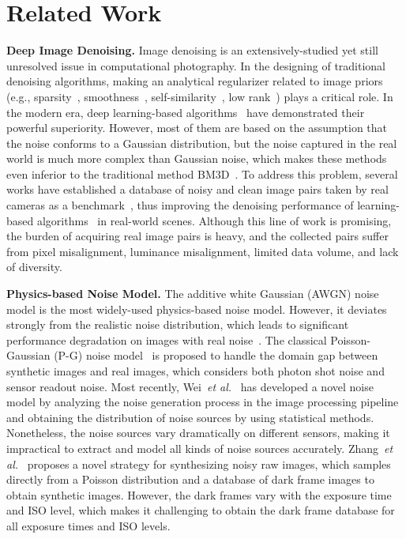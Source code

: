 \documentclass[10pt,twocolumn,letterpaper]{article}
\def\etal{{\it{et al.}}}
\begin{document}
\section{Related Work}
\label{related}
\textbf{Deep Image Denoising.} Image denoising is an extensively-studied yet still unresolved issue in computational photography. In the designing of traditional denoising algorithms, making an analytical regularizer related to image priors (e.g., sparsity~\cite{elad2006image, aharon2006k}, smoothness~\cite{portilla2003image, rudin1992nonlinear}, self-similarity~\cite{buades2005non, dabov2007image, maggioni2012video}, low rank~\cite{gu2014weighted}) plays a critical role. In the modern era, deep learning-based algorithms~\cite{zhang2017beyond, brooks2019unprocessing, guo2019toward, yue2019variational} have demonstrated their powerful superiority. However, most of them are based on the assumption that the noise conforms to a Gaussian distribution, but the noise captured in the real world is much more complex than Gaussian noise, which makes these methods even inferior to the traditional method BM3D~\cite{dabov2006image}. To address this problem, several works have established a database of noisy and clean image pairs taken by real cameras as a benchmark~\cite{abdelhamed2018high, plotz2017benchmarking}, thus improving the denoising performance of learning-based algorithms~\cite{chen2015learning, chen2018deep, gharbi2016deep} in real-world scenes. Although this line of work is promising, the burden of acquiring real image pairs is heavy, and the collected pairs suffer from pixel misalignment, luminance misalignment, limited data volume, and lack of diversity.

\textbf{Physics-based Noise Model.} The additive white Gaussian (AWGN) noise model is the most widely-used physics-based noise model. However, it deviates strongly from the realistic noise distribution, which leads to significant performance degradation on images with real noise~\cite{plotz2017benchmarking,abdelhamed2018high}. The classical Poisson-Gaussian (P-G) noise model~\cite{foi2008practical,foi2009clipped, hasinoff2014photon, brooks2019unprocessing, mildenhall2018burst, wang2019enhancing} is proposed to handle the domain gap between synthetic images and real images, which considers both photon shot noise and sensor readout noise. Most recently, Wei~\etal~\cite{wei2020physics} has developed a novel noise model by analyzing the noise generation process in the image processing pipeline and obtaining the distribution of noise sources by using statistical methods. Nonetheless, the noise sources vary dramatically on different sensors, making it impractical to extract and model all kinds of noise sources accurately. Zhang~\etal~\cite{zhang2021rethinking} proposes a novel strategy for synthesizing noisy raw images, which samples directly from a Poisson distribution and a database of dark frame images to obtain synthetic images. However, the dark frames vary with the exposure time and ISO level, which makes it challenging to obtain the dark frame database for all exposure times and ISO levels.
\end{document}
